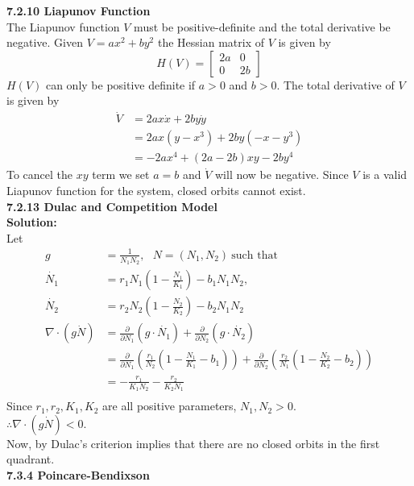 \documentclass[12pt]{article}
\newcommand{\mycbox}[1]{\tikz{\path[draw=#1,fill=#1] (0,0) rectangle (.2cm,.2cm);}}
\begin{document}
	{\bf 7.2.10 Liapunov Function} \\
	The Liapunov function $V$ must be positive-definite and the total derivative be negative. Given $V = ax^2 + by^2$ the Hessian matrix of $V$ is given by
	\begin{equation*}
	H(V)=
	\begin{bmatrix}
	2a & 0\\
	0 & 2b
	\end{bmatrix}
	\end{equation*}
	$H(V)$ can only be positive definite if $a>0$ and $b>0$. The total derivative of $V$ is given by
	\begin{align*}
	\dot{V} &= 2ax\dot{x} + 2by\dot{y}\\
	&= 2ax(y-x^3) + 2by(-x-y^3)\\
	&= -2ax^4 + (2a-2b)xy - 2by^4
	\end{align*}
	To cancel the $xy$ term we set $a=b$ and $\dot{V}$ will now be negative.
	Since $V$ is a valid Liapunov function for the system, closed orbits cannot exist.
	\\
	{\bf 7.2.13 Dulac and Competition Model}\\
	{\bf Solution:} \\
	Let 
	\begin{align*}
	g &=\frac{1}{N_1 N_2},~~~ N=(N_1, N_2)~\text{such that}~\\ \dot{N_1} &=r_1 N_1(1-\frac{N_1}{K_1})-b_1N_1N_2,\\
	\dot{N_2} &=r_2 N_2(1-\frac{N_2}{K_2})-b_2N_1N_2\\
	\nabla \cdot \left(g \dot{N}\right)&=\frac{\partial}{\partial N_1}\left(g \cdot \dot{N_1}\right)+\frac{\partial}{\partial N_2}\left(g \cdot \dot{N_2}\right)\\
	&=\frac{\partial}{\partial N_1}\left(\frac{r_1}{N_2}\left(1-\frac{N_1}{K_1}-b_1\right)\right)+\frac{\partial}{\partial N_2}\left(\frac{r_2}{N_1}\left(1-\frac{N_2}{K_2}-b_2\right)\right)\\
	&=-\frac{r_1}{K_1 N_2}-\frac{r_2}{K_2 N_1}\\
	\end{align*}
	Since $r_1,r_2, K_1,K_2$ are all positive parameters, $N_1, N_2 >0.$\\
	$\therefore \nabla \cdot \left(g \dot{N} \right)<0.$\\
	Now, by Dulac's criterion implies that there are no closed orbits in the first quadrant. \mycbox{black}\\
	\bigskip\noindent
	{\bf 7.3.4 Poincare-Bendixson}\\
\end{document}
